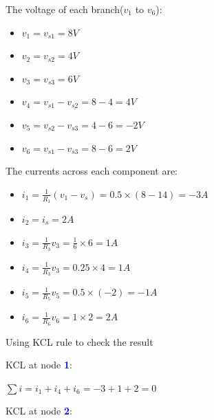 \documentclass[a4 paper]{article}
\newcommand{\blue}[1]{\textcolor{blue}{#1}}
\numberwithin{equation}{section}
\newcommand{\0}{\mathbf{0}}
\begin{document}
The voltage of each branch($v_1$ to $v_6$):
\begin{itemize} \itemsep3pt \parskip0pt  
  \item[] \hspace{6.6 cm}$v_1 = v_{s1} = 8V$
  \item[] \hspace{6.6 cm}$v_2 = v_{s2} = 4V$
  \item[] \hspace{6.6 cm}$v_3 = v_{s3} = 6V$
  \item[] \hspace{6.6 cm}$v_4 = v_{s1} - v_{s2} = 8-4 = 4V$
  \item[] \hspace{6.6 cm}$v_5 = v_{s2} - v_{s3} = 4-6 = -2V$
  \item[] \hspace{6.6 cm}$v_6 = v_{s1} - v_{s3} = 8-6 = 2V$
\end{itemize}

The currents across each component are:

\begin{itemize} \itemsep3pt \parskip0pt  
  \item[] \hspace{6.6 cm}$i_1 = \frac{1}{R_1}(v_1-v_s) = 0.5 \times (8-14) = -3A$
  \item[] \hspace{6.6 cm}$i_2 = i_s = 2A$
  \item[] \hspace{6.6 cm}$i_3 = \frac{1}{R_3}v_3 = \frac{1}{6} \times 6 = 1A$
  \item[] \hspace{6.6 cm}$i_4 = \frac{1}{R_3}v_3 = 0.25 \times 4 = 1A$
  \item[] \hspace{6.6 cm}$i_5 = \frac{1}{R_5}v_5 = 0.5 \times (-2) = -1A$
  \item[] \hspace{6.6 cm}$i_6 = \frac{1}{R_6}v_6 = 1 \times 2 = 2A$
\end{itemize}

Using KCL rule to check the result
\vspace{8 mm}

KCL at node \blue{\bf 1}:

\hspace{6.6 cm}$\sum i = i_1 + i_4 + i_6 = -3 + 1 + 2 = 0$

\vspace{2 mm}
KCL at node \blue{\bf 2}:
\end{document}
